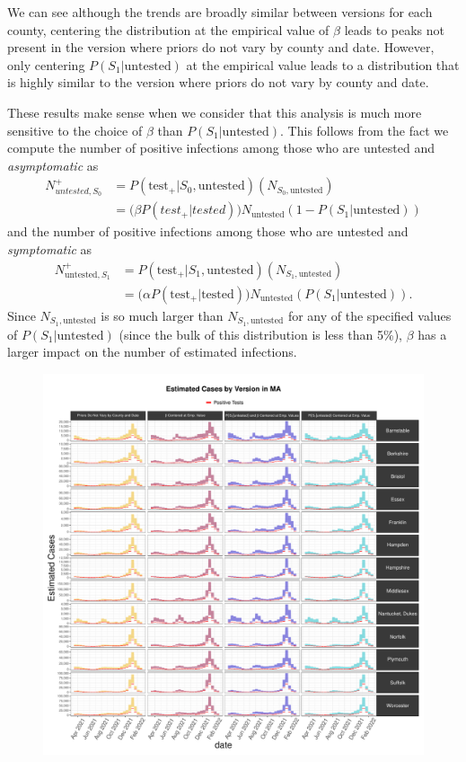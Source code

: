 \documentclass[12pt,twoside]{smiththesis}
\begin{document}
We can see although the trends are broadly similar between versions for each county, centering the distribution at the empirical value of \(\beta\) leads to peaks not present in the version where priors do not vary by county and date. However, only centering \(P(S_1|\text{untested})\) at the empirical value leads to a distribution that is highly similar to the version where priors do not vary by county and date.

These results make sense when we consider that this analysis is much more sensitive to the choice of \(\beta\) than \(P(S_1|\text{untested})\). This follows from the fact we compute the number of positive infections among those who are untested and \emph{asymptomatic} as
\begin{align*}
N^+_{untested,S_0} &= P(\text{test}_+| S_0,\text{untested}) (N_{S_0,\text{untested}})\\
&= \Big( \beta P(test_+ |tested) \Big) N_{\text{untested}} (1-P(S_1|\text{untested}))
\end{align*}
and the number of positive infections among those who are untested and \emph{symptomatic} as\\
\begin{align*} N^+_{\text{untested},S_1}& = P(\text{test}_+| S_1,\text{untested}) (N_{S_1,\text{untested}})\\
&= \Big( \alpha P(\text{test}_+ |\text{tested}) \Big) N_{\text{untested}} (P(S_1|\text{untested})).
\end{align*}
Since \(N_{S_1, \text{untested}}\) is so much larger than \(N_{S_1, \text{untested}}\) for any of the specified values of \(P(S_1|\text{untested})\) (since the bulk of this distribution is less than 5\%), \(\beta\) has a larger impact on the number of estimated infections.
\begin{figure}
\includegraphics[width=0.95\linewidth]{figure/ma_pb_compared_to_observed} \caption{\label{fig:pb_counts_ma}}\label{fig:unnamed-chunk-2}
\end{figure}
\end{document}

